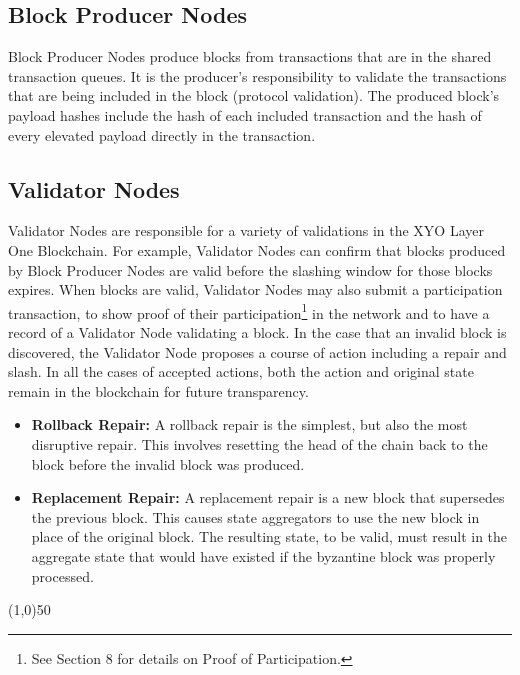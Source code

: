 \documentclass{article}
\begin{document}
\subsection{Block Producer Nodes}
Block Producer Nodes produce blocks from transactions that are in the shared
transaction queues. It is the producer's responsibility to validate the
transactions that are being included in the block (protocol validation). The
produced block's payload hashes include the hash of each included transaction
and the hash of every elevated payload directly in the transaction.

\subsection{Validator Nodes}
Validator Nodes are responsible for a variety of validations in the XYO Layer
One Blockchain. For example, Validator Nodes can confirm that blocks produced
by Block Producer Nodes are valid before the slashing window for those blocks
expires. When blocks are valid, Validator Nodes may also submit a participation
transaction, to show proof of their participation\footnote{See Section 8 for
    details on Proof of Participation.} in the network and to have a record of a
Validator Node validating a block. In the case that an invalid block is
discovered, the Validator Node proposes a course of action including a repair
and slash. In all the cases of accepted actions, both the action and original
state remain in the blockchain for future transparency.

\begin{itemize}
    \item \textbf{Rollback Repair:} A rollback repair is the simplest, but also the most disruptive repair. This involves resetting the head of the chain back to the block before the invalid block was produced.
    \item \textbf{Replacement Repair:} A replacement repair is a new block that supersedes the previous block. This causes state aggregators to use the new block in place of the original block. The resulting state, to be valid, must result in the aggregate state that would have existed if the byzantine block was properly processed.
\end{itemize}

\begin{center}
    \line(1,0){50}
\end{center}
\end{document}
